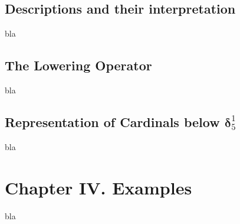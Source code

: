 \documentclass[bibother]{asl}
\theoremstyle{definition}
\theoremstyle{remark}
\newcommand{\bd}{\boldsymbol{\delta}}
\begin{document}
\subsection{Descriptions and their interpretation} bla
\subsection{The Lowering Operator} bla
\subsection{Representation of Cardinals below $\bd^1_5$} bla

\section{Chapter IV. Examples} bla




\clearpage
%
%
%
%
%
%
\end{document}
